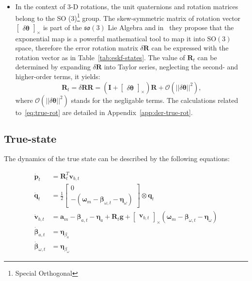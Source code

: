 \begin{itemize}
    \item 
    In the context of 3-D rotations, the unit quaternions and rotation matrices belong to the SO (3)\footnote{Special Orthogonal} group. The skew-symmetric matrix of rotation vector $\begin{bmatrix} \delta\boldsymbol{\theta} \end{bmatrix}_\times$ is part of the $\mathfrak{so}(3)$ Lie Algebra and in~\cite{quaternion-eskf} they propose that the exponential map is a powerful mathematical tool to map it into $\mathrm{SO}(3)$ space, therefore the error rotation matrix $\delta\mathbf{R}$ can be expressed with the rotation vector as in Table~\ref{tab:eskf-states}. The value of $\mathbf{R}_t$ can be determined by expanding $\delta\mathbf{R}$ into Taylor series, neglecting the second- and higher-order terms, it yields:
    \begin{equation}
         \mathbf{R}_t=\delta\mathbf{R}\mathbf{R}=\left(\mathbf{I} +\begin{bmatrix} \delta\boldsymbol{\theta} \end{bmatrix}_\times\right) \mathbf{R} + \mathcal{O}(||\delta\boldsymbol{\theta}||^2),
    \label{eq:true-rot}
    \end{equation}    
    where $\mathcal{O}(||\delta\boldsymbol{\theta}||^2)$ stands for the negligable terms. The calculations related to~\eqref{eq:true-rot} are detailed in Appendix~\ref{app:der-true-rot}.
\end{itemize} 


\subsection*{True-state}

The dynamics of the true state can be described by the following equations:

\begin{subequations}
    \begin{align}
        \dot{\mathbf{p}}_{t}&=\mathbf{R}_t^T \mathbf{v}_{b,t} \\
        \dot{\mathbf{q}}_{t}&=\frac{1}{2}\begin{bmatrix}0\\ -(\boldsymbol{\omega}_m-\boldsymbol{\beta}_{\omega, t}-\boldsymbol{\eta}_{\omega}) \end{bmatrix}\otimes \mathbf{q}_{t} \label{subeq:true-q} \\
        \dot{\mathbf{v}}_{b,t}&=\mathbf{a}_m-\boldsymbol{\beta}_{a,t}-\boldsymbol{\eta}_a +\mathbf{R}_t\mathbf{g} + \begin{bmatrix}\mathbf{v}_{b,t} \end{bmatrix}_{\times}(\boldsymbol{\omega}_m-\boldsymbol{\beta}_{\omega,t} -\boldsymbol{\eta}_\omega) \label{subeq:true-vb}\\
        \dot{\boldsymbol{\beta}}_{a,t}&=\boldsymbol{\eta}_{\beta_a} \label{subeq:true-ba}\\
        \dot{\boldsymbol{\beta}}_{\omega,t}&=\boldsymbol{\eta}_{\beta_\omega} \label{subeq:true-bw}
    \end{align}\label{eq:true-state}
\end{subequations}

